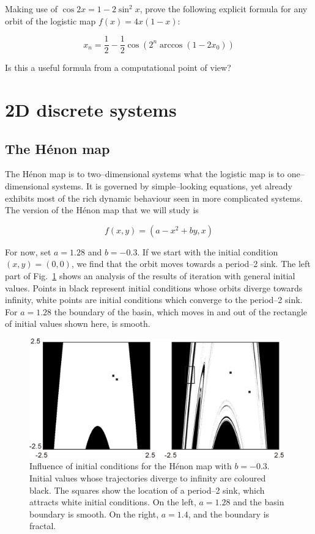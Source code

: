 \begin{sidebar}
\begin{ex}
Making use of $\cos 2x = 1- 2 \sin^2 x$, prove the following explicit formula for any orbit of the logistic map $f(x) = 4x(1-x)$:

$$x_n= \frac{1}{2} -\frac{1}{2} \cos(2^n\arccos(1-2x_0))$$

Is this a useful formula from a computational point of view?
\end{ex}
\end{sidebar}

\section{2D discrete systems}

\subsection{The H\'{e}non map}

The H\'{e}non map is to two--dimensional systems what the logistic map is to one--dimensional systems. It is governed by simple--looking equations, yet already exhibits most of the rich dynamic behaviour seen in more complicated systems. The version of the H\'{e}non map that we will study is

\begin{equation}
f(x,y) = (a-x^2+by, x)
\end{equation} 
 
For now, set $a=1.28$ and $b=-0.3$. If we start with the initial condition $(x,y)=(0,0)$, we find that the orbit moves towards a period--2 sink. The left part of Fig.~\ref{fig-henon-basin} shows an analysis of the results of iteration with general initial values. Points in black represent initial conditions whose orbits diverge towards infinity, white points are initial conditions which converge to the period--2 sink. For $a=1.28$ the boundary of the basin, which moves in and out of the rectangle of initial values shown here, is smooth.

\begin{figure}
\centering
\includegraphics[width=11cm]{dynamic/figures/henon_basin}
\caption{Influence of initial conditions for the H\'{e}non map with $b=-0.3$. Initial values whose trajectories diverge to infinity are coloured black. The squares show the location of a period--2 sink, which attracts white initial conditions. On the left, $a=1.28$ and the basin boundary is smooth. On the right, $a=1.4$, and the boundary is fractal.}
\label{fig-henon-basin}
\end{figure} 

